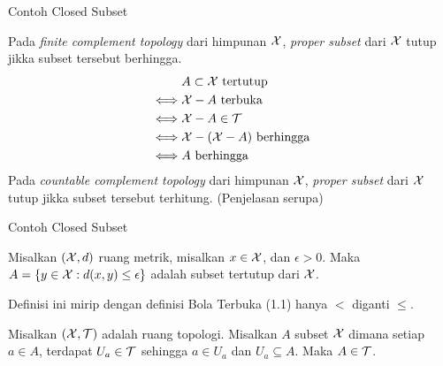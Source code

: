 \begin{frame}{Contoh Closed Subset}
    \begin{tcolorbox}[enhanced,title=Contoh 38 (Penjelasan), frame style tile={width=\paperwidth}{\wallpaper}]
        Pada \textit{finite complement topology} dari himpunan $\mathcal{X}$, \textit{proper subset} dari
        $\mathcal{X}$ tutup jikka subset tersebut berhingga.
        \begin{align*}
            &A \subset \mathcal{X} \text{ tertutup}\\
            \iff &\mathcal{X} - A \text{ terbuka}\\
            \iff &\mathcal{X} - A \in \mathcal{T}\\
            \iff &\mathcal{X} - (\mathcal{X} - A) \text{ berhingga}\\
            \iff & A \text{ berhingga}
        \end{align*}
        Pada \textit{countable complement topology} dari himpunan $\mathcal{X}$, \textit{proper subset} dari
        $\mathcal{X}$ tutup jikka subset tersebut terhitung. (Penjelasan serupa)
    \end{tcolorbox}
\end{frame}


\begin{frame}{Contoh Closed Subset}
    \begin{tcolorbox}[enhanced,title=Contoh 39, frame style tile={width=\paperwidth}{\wallpaper}]
        Misalkan $(\mathcal{X}, d)$ ruang metrik, misalkan $x \in \mathcal{X}$, dan $\epsilon >0$. Maka
        $A = \{y \in \mathcal{X}: d(x,y) \leq \epsilon\}$ adalah subset tertutup dari $\mathcal{X}$.
    \end{tcolorbox}
    Definisi ini mirip dengan definisi Bola Terbuka (1.1) hanya $<$ diganti $\leq$.
    \begin{tcolorbox}[enhanced,title=Teorema 1.7 (1.2), frame style tile={width=\paperwidth}{\wallpaper}]
        Misalkan $(\mathcal{X}, \mathcal{T})$ adalah ruang topologi. Misalkan $A$ subset $\mathcal{X}$ dimana
        setiap $a \in A$, terdapat $U_a \in \mathcal{T}$ sehingga $a \in U_a$ dan $U_a \subseteq A$.
        Maka $A \in \mathcal{T}$.
    \end{tcolorbox}
\end{frame}

